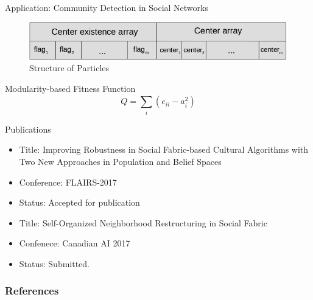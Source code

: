 \documentclass[table]{beamer}
\begin{document}
	\begin{frame}{Application: Community Detection in Social Networks}
		\begin{figure}[v]
			\includegraphics[scale=0.5]{Particle1}
			\centering
			\caption{Structure of Particles}
			\label{ref:paricle1}
		\end{figure}
		
		\begin{block}{Modularity-based Fitness Function}
			\begin{equation}
				Q=\sum_{i}^{}(e_{ii}-a_{i}^{2})
			\end{equation}
		\end{block}
	\end{frame}

	\begin{frame}{Publications}
		\begin{block}{}
			\begin{itemize}
				\item Title: Improving Robustness in Social Fabric-based Cultural Algorithms with Two New Approaches in Population and Belief Spaces
				\item Conference: FLAIRS-2017
				\item Status: Accepted for publication
			\end{itemize}
		\end{block}
		
		\begin{block}{}
			\begin{itemize}
				\item Title: Self-Organized Neighborhood Restructuring in Social Fabric
				\item Confenece: Canadian AI 2017
				\item Status: Submitted.
			\end{itemize}
		\end{block}
	\end{frame}

	\begin{frame}[allowframebreaks]
		\frametitle{References}
		\fontsize{6pt}{3pt}
		
		
	\end{frame}
	
\end{document}
